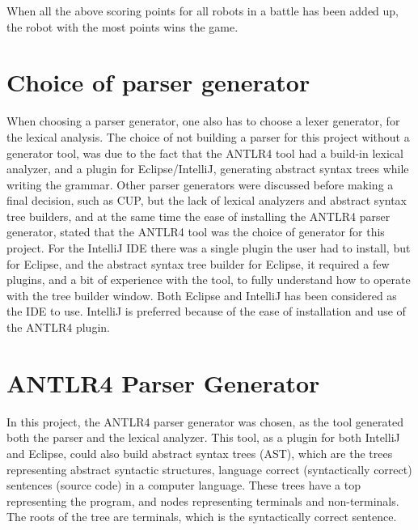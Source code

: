 When all the above scoring points for all robots in a battle has been added up, the robot with the most points wins the game.


\section{Choice of parser generator}
\label{sec:ParserGenerator}
When choosing a parser generator, one also has to choose a lexer generator, for the lexical analysis. The choice of not building a parser for this project without a generator tool, was due to the fact that the ANTLR4 tool had a build-in lexical analyzer, and a plugin for Eclipse/IntelliJ, generating abstract syntax trees while writing the grammar. Other parser generators were discussed before making a final decision, such as CUP, but the lack of lexical analyzers and abstract syntax tree builders, and at the same time the ease of installing the ANTLR4 parser generator, stated that the ANTLR4 tool was the choice of generator for this project. For the IntelliJ IDE there was a single plugin the user had to install, but for Eclipse, and the abstract syntax tree builder for Eclipse, it required a few plugins, and a bit of experience with the tool, to fully understand how to operate with the tree builder window. Both Eclipse and IntelliJ has been considered as the IDE to use. IntelliJ is preferred because of the ease of installation and use of the ANTLR4 plugin.
 
\section{ANTLR4 Parser Generator}
\label{Antlr}
In this project, the ANTLR4 parser generator was chosen, as the tool generated both the parser and the lexical analyzer. This tool, as a plugin for both IntelliJ and Eclipse, could also build abstract syntax trees (AST), which are the trees representing abstract syntactic structures, language correct (syntactically correct) sentences (source code) in a computer language. These trees have a top representing the program, and nodes representing terminals and non-terminals. The roots of the tree are terminals, which is the syntactically correct sentence.

